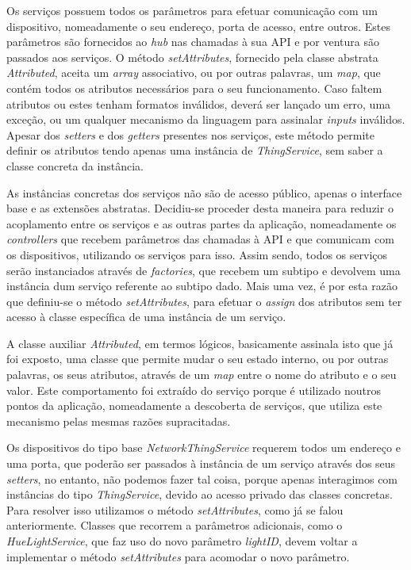 Os serviços possuem todos os parâmetros para efetuar comunicação com um dispositivo, nomeadamente o seu endereço, porta de acesso, entre outros. Estes parâmetros são fornecidos ao \textit{hub} nas chamadas à sua API e por ventura são passados aos serviços. O método \textit{setAttributes}, fornecido pela classe abstrata \textit{Attributed}, aceita um \textit{array} associativo, ou por outras palavras, um \textit{map}, que contém todos os atributos necessários para o seu funcionamento. Caso faltem atributos ou estes tenham formatos inválidos, deverá ser lançado um erro, uma exceção, ou um qualquer mecanismo da linguagem para assinalar \textit{inputs} inválidos. Apesar dos \textit{setters} e dos \textit{getters} presentes nos serviços, este método permite definir os atributos tendo apenas uma instância de \textit{ThingService}, sem saber a classe concreta da instância.

As instâncias concretas dos serviços não são de acesso público, apenas o interface base e as extensões abstratas. Decidiu-se proceder desta maneira para reduzir o acoplamento entre os serviços e as outras partes da aplicação, nomeadamente os \textit{controllers} que recebem parâmetros das chamadas à API e que comunicam com os dispositivos, utilizando os serviços para isso. Assim sendo, todos os serviços serão instanciados através de \textit{factories}, que recebem um subtipo e devolvem uma instância dum serviço referente ao subtipo dado. Mais uma vez, é por esta razão que definiu-se o método \textit{setAttributes}, para efetuar o \textit{assign} dos atributos sem ter acesso à classe específica de uma instância de um serviço.

A classe auxiliar \textit{Attributed}, em termos lógicos, basicamente assinala isto que já foi exposto, uma classe que permite mudar o seu estado interno, ou por outras palavras, os seus atributos, através de um \textit{map} entre o nome do atributo e o seu valor. Este comportamento foi extraído do serviço porque é utilizado noutros pontos da aplicação, nomeadamente a descoberta de serviços, que utiliza este mecanismo pelas mesmas razões supracitadas.

Os dispositivos do tipo base \textit{NetworkThingService} requerem todos um endereço e uma porta, que poderão ser passados à instância de um serviço através dos seus \textit{setters}, no entanto, não podemos fazer tal coisa, porque apenas interagimos com instâncias do tipo \textit{ThingService}, devido ao acesso privado das classes concretas. Para resolver isso utilizamos o método \textit{setAttributes}, como já se falou anteriormente. Classes que recorrem a parâmetros adicionais, como o \textit{HueLightService}, que faz uso do novo parâmetro \textit{lightID}, devem voltar a implementar o método \textit{setAttributes} para acomodar o novo parâmetro.


